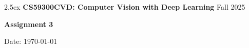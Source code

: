 \documentclass[oneside,11pt,letter]{article}
\newcommand{\myname}{}
\newcommand{\report}{}
\begin{document}

\thispagestyle{empty}
\begin{mdframed}
\baselineskip2.5ex
{\bf CS59300CVD: Computer Vision with Deep Learning}
\hfill
Fall 2025

{\Large
\begin{center}
{\bf \sf Assignment 3}
\end{center}
}

{\bf \myname}
\hfill
Date: \today
\end{mdframed}

\report{}

\end{document}
